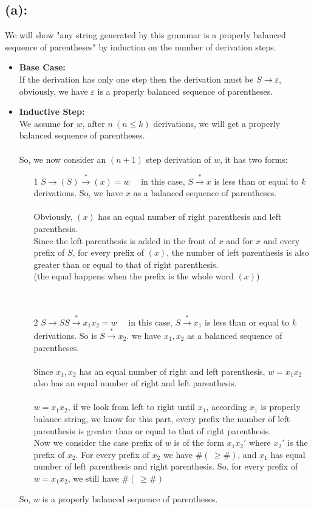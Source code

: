 \documentclass [9 pt]{article}
\theoremstyle{definition}
\begin{document}
\subsection*{(a):}
We will show "any string generated by this grammar is a properly balanced sequence of parentheses" by induction on the number of derivation steps.
\begin{itemize}
	\item \textbf{Base Case:} \\
	If the derivation has only one step then the derivation must be $S\to \varepsilon $, obviously, we have $\varepsilon$ is a properly balanced sequence of parentheses.
	\item \textbf{Inductive Step:}\\
	We assume for $w$, after $n \ (n \leq k)$ derivations, we will get a properly balanced sequence of parentheses.\\\\
	So, we now consider an $(n + 1)$ step derivation of $w$, it has two forms:
	\begin{itemize}
		\item[1] $S \to (S) \xrightarrow{*} (x) = w \quad $ in this case, $S \xrightarrow{*} x$ is less than or equal to $k$ derivations. So, we have $x$ as a balanced sequence of parentheses.\\\\
		Obviously, $(x)$ has an equal number of right parenthesis and left parenthesis. \\
		Since the left parenthesis is added in the front of $x$ and for $x$ and every prefix of $S$,  for every prefix of $(x)$, the number of left parenthesis is also greater than or equal to that of right parenthesis.\\
 		 \bigg(the equal happens when the prefix is the whole word $(x)$\bigg)\\
  		\\
  		\\
  		\item[2] $S \to SS \xrightarrow{*} x_1x_2 = w \quad $ in this case, $S \xrightarrow{*} x_1$ is less than or equal to $k$ derivations. So is $S \xrightarrow{*} x_2$. we have $x_1, x_2$ as a balanced sequence of parentheses.\\\\
  		Since $x_1, x_2$ has an equal number of right and left parenthesis, $w = x_1x_2$ also has an equal number of right and left parenthesis.\\
  		\\
  		$w = x_1x_2$, if we look from left to right until $x_1$, according $x_1$ is properly balance string, we know for this part, every prefix the number of left parenthesis is greater than or equal to that of right parenthesis.\\
  		Now we consider the case prefix of $w$ is of the form $x_1x_2'$ where  $x_2'$ is the prefix of $x_2$. For every prefix of $x_2$ we have $\#( \ \geq \# )$, and $x_1$ has equal number of left parenthesis and right parenthesis. So, for every prefix of $w = x_1x_2$, we still have $\#( \ \geq \# )$ \\
	\end{itemize}
	 So, $w$ is a properly balanced sequence of parentheses.
\end{itemize}
\end{document}
